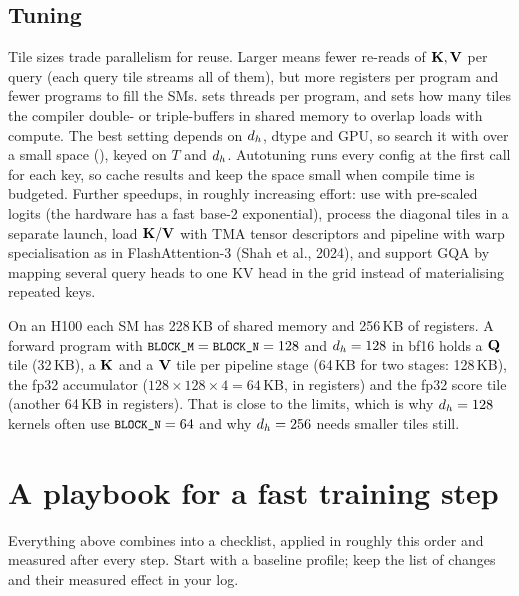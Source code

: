 \subsection{Tuning}

Tile sizes trade parallelism for reuse. Larger  means fewer re-reads of $\mathbf{K},\mathbf{V}$
per query (each query tile streams all of them), but more registers per program and fewer programs
to fill the SMs.  sets threads per program, and  sets how many tiles the
compiler double- or triple-buffers in shared memory to overlap loads with compute. The best setting
depends on $d_{h}$, dtype and GPU, so search it with  over a small space
(), keyed on $T$ and $d_{h}$. Autotuning runs every
config at the first call for each key, so cache results and keep the space small when
compile time is budgeted. Further speedups, in roughly increasing effort: use  with
pre-scaled logits (the hardware has a fast base-2 exponential), process the diagonal tiles in a
separate launch, load $\mathbf{K}/\mathbf{V}$ with TMA tensor descriptors and pipeline with warp
specialisation as in FlashAttention-3 (Shah et al., 2024), and support GQA by mapping several query
heads to one KV head in the grid instead of materialising repeated keys.

\begin{napkinmath}
On an H100 each SM has 228\,KB of shared memory and 256\,KB of registers. A forward program with
$\texttt{\small BLOCK\_M}=\texttt{\small BLOCK\_N}=128$ and $d_{h}=128$ in bf16 holds a $\mathbf{Q}$ tile (32\,KB), a
$\mathbf{K}$ and a $\mathbf{V}$ tile per pipeline stage (64\,KB for two stages: 128\,KB), the fp32
accumulator ($128\times128\times4=64$\,KB, in registers) and the fp32 score tile (another 64\,KB in
registers). That is close to the limits, which is why $d_{h}=128$ kernels often use
$\texttt{\small BLOCK\_N}=64$ and why $d_{h}=256$ needs smaller tiles still.
\end{napkinmath}

\section{A playbook for a fast training step}\label{sec:perf:playbook}

Everything above combines into a checklist, applied in roughly this order and measured after every
step. Start with a baseline profile; keep the list of changes and their measured effect in your log.

